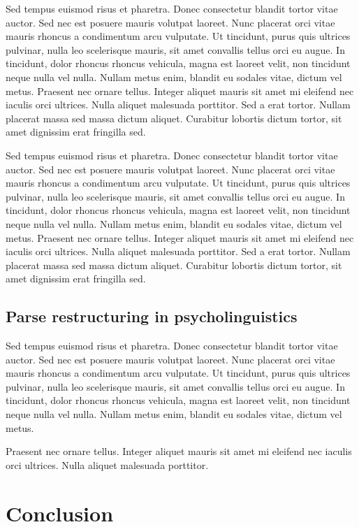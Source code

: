 \documentclass[11pt,letterpaper]{article}
\begin{document}
Sed tempus euismod risus et pharetra. Donec consectetur blandit tortor vitae auctor. Sed nec est posuere mauris volutpat laoreet. Nunc placerat orci vitae mauris rhoncus a condimentum arcu vulputate. Ut tincidunt, purus quis ultrices pulvinar, nulla leo scelerisque mauris, sit amet convallis tellus orci eu augue. In tincidunt, dolor rhoncus rhoncus vehicula, magna est laoreet velit, non tincidunt neque nulla vel nulla. Nullam metus enim, blandit eu sodales vitae, dictum vel metus. Praesent nec ornare tellus. Integer aliquet mauris sit amet mi eleifend nec iaculis orci ultrices. Nulla aliquet malesuada porttitor. Sed a erat tortor. Nullam placerat massa sed massa dictum aliquet. Curabitur lobortis dictum tortor, sit amet dignissim erat fringilla sed.

Sed tempus euismod risus et pharetra. Donec consectetur blandit tortor vitae auctor. Sed nec est posuere mauris volutpat laoreet. Nunc placerat orci vitae mauris rhoncus a condimentum arcu vulputate. Ut tincidunt, purus quis ultrices pulvinar, nulla leo scelerisque mauris, sit amet convallis tellus orci eu augue. In tincidunt, dolor rhoncus rhoncus vehicula, magna est laoreet velit, non tincidunt neque nulla vel nulla. Nullam metus enim, blandit eu sodales vitae, dictum vel metus. Praesent nec ornare tellus. Integer aliquet mauris sit amet mi eleifend nec iaculis orci ultrices. Nulla aliquet malesuada porttitor. Sed a erat tortor. Nullam placerat massa sed massa dictum aliquet. Curabitur lobortis dictum tortor, sit amet dignissim erat fringilla sed.

\subsection{Parse restructuring in psycholinguistics}

Sed tempus euismod risus et pharetra. Donec consectetur blandit tortor vitae auctor. Sed nec est posuere mauris volutpat laoreet. Nunc placerat orci vitae mauris rhoncus a condimentum arcu vulputate. Ut tincidunt, purus quis ultrices pulvinar, nulla leo scelerisque mauris, sit amet convallis tellus orci eu augue. In tincidunt, dolor rhoncus rhoncus vehicula, magna est laoreet velit, non tincidunt neque nulla vel nulla. Nullam metus enim, blandit eu sodales vitae, dictum vel metus.

Praesent nec ornare tellus. Integer aliquet mauris sit amet mi eleifend nec iaculis orci ultrices. Nulla aliquet malesuada porttitor.


\section{Conclusion}
\end{document}
